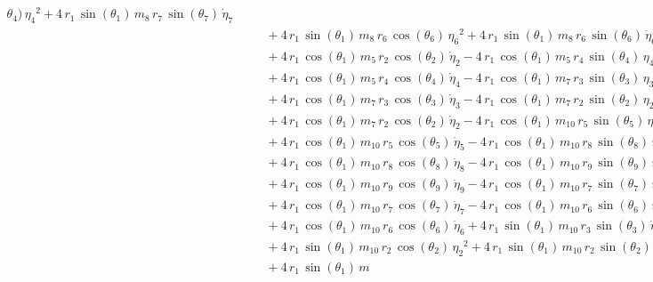 \begin{eqnarray*}
{\theta_{4}})\,{{\eta_{4}}}^2 + 4\,r_{1}\,\sin({\theta_{1}})\,m_{8}\,r
_{7}\,\sin({\theta_{7}})\,{\dot{\eta}_{7}} \\ &&\quad\mbox{} + 4\,r_{1
}\,\sin({\theta_{1}})\,m_{8}\,r_{6}\,\cos({\theta_{6}})\,{{\eta_{6}}}^
2 + 4\,r_{1}\,\sin({\theta_{1}})\,m_{8}\,r_{6}\,\sin({\theta_{6}})\,{
\dot{\eta}_{6}} \\ &&\quad\mbox{} + 4\,r_{1}\,\cos({\theta_{1}})\,m_{5
}\,r_{2}\,\cos({\theta_{2}})\,{\dot{\eta}_{2}} - 4\,r_{1}\,\cos({
\theta_{1}})\,m_{5}\,r_{4}\,\sin({\theta_{4}})\,{{\eta_{4}}}^2
 \\ &&\quad\mbox{} + 4\,r_{1}\,\cos({\theta_{1}})\,m_{5}\,r_{4}\,\cos(
{\theta_{4}})\,{\dot{\eta}_{4}} - 4\,r_{1}\,\cos({\theta_{1}})\,m_{7}
\,r_{3}\,\sin({\theta_{3}})\,{{\eta_{3}}}^2 \\ &&\quad\mbox{} + 4\,r_{
1}\,\cos({\theta_{1}})\,m_{7}\,r_{3}\,\cos({\theta_{3}})\,{\dot{\eta}
_{3}} - 4\,r_{1}\,\cos({\theta_{1}})\,m_{7}\,r_{2}\,\sin({\theta_{2}})
\,{{\eta_{2}}}^2 \\ &&\quad\mbox{} + 4\,r_{1}\,\cos({\theta_{1}})\,m_{
7}\,r_{2}\,\cos({\theta_{2}})\,{\dot{\eta}_{2}} - 4\,r_{1}\,\cos({
\theta_{1}})\,m_{10}\,r_{5}\,\sin({\theta_{5}})\,{{\eta_{5}}}^2
 \\ &&\quad\mbox{} + 4\,r_{1}\,\cos({\theta_{1}})\,m_{10}\,r_{5}\,\cos
({\theta_{5}})\,{\dot{\eta}_{5}} - 4\,r_{1}\,\cos({\theta_{1}})\,m_{10
}\,r_{8}\,\sin({\theta_{8}})\,{{\eta_{8}}}^2 \\ &&\quad\mbox{} + 4\,r
_{1}\,\cos({\theta_{1}})\,m_{10}\,r_{8}\,\cos({\theta_{8}})\,{
\dot{\eta}_{8}} - 4\,r_{1}\,\cos({\theta_{1}})\,m_{10}\,r_{9}\,\sin({
\theta_{9}})\,{{\eta_{9}}}^2 \\ &&\quad\mbox{} + 4\,r_{1}\,\cos({
\theta_{1}})\,m_{10}\,r_{9}\,\cos({\theta_{9}})\,{\dot{\eta}_{9}} - 4
\,r_{1}\,\cos({\theta_{1}})\,m_{10}\,r_{7}\,\sin({\theta_{7}})\,{{\eta
_{7}}}^2 \\ &&\quad\mbox{} + 4\,r_{1}\,\cos({\theta_{1}})\,m_{10}\,r_{
7}\,\cos({\theta_{7}})\,{\dot{\eta}_{7}} - 4\,r_{1}\,\cos({\theta_{1}}
)\,m_{10}\,r_{6}\,\sin({\theta_{6}})\,{{\eta_{6}}}^2 \\ &&\quad\mbox{}
 + 4\,r_{1}\,\cos({\theta_{1}})\,m_{10}\,r_{6}\,\cos({\theta_{6}})\,{
\dot{\eta}_{6}} + 4\,r_{1}\,\sin({\theta_{1}})\,m_{10}\,r_{3}\,\sin({
\theta_{3}})\,{\dot{\eta}_{3}} \\ &&\quad\mbox{} + 4\,r_{1}\,\sin({
\theta_{1}})\,m_{10}\,r_{2}\,\cos({\theta_{2}})\,{{\eta_{2}}}^2 + 4\,r
_{1}\,\sin({\theta_{1}})\,m_{10}\,r_{2}\,\sin({\theta_{2}})\,{
\dot{\eta}_{2}} \\ &&\quad\mbox{} + 4\,r_{1}\,\sin({\theta_{1}})\,m_{
}
\end{eqnarray*}
